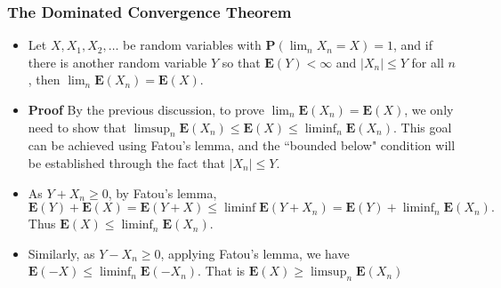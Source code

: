 \documentclass[handout]{beamer}
\newcommand{\BP}{\mathbf{P}}
\newcommand{\BE}{\mathbf{E}}
\begin{document}
\frame
{
  \frametitle{The Dominated Convergence Theorem} 

   \begin{itemize}
   
  
   \item<1->[] \begin{Theorem} Let $X, X_1, X_2, \ldots $ be random variables with $\BP(\lim_n X_n=X)=1$, and if there is another random variable $Y$ so that $\BE(Y)<\infty$ and $|X_n|\leq Y$ for all $n$, then $\lim_n \BE(X_n)=\BE(X)$.\end{Theorem}

                
                               \item<2-> \textbf{Proof} By the previous discussion, to prove $\lim_n \BE(X_n)=\BE(X)$, we only need to show that  $\limsup_n \BE(X_n)\leq \BE(X)\leq  \liminf_n \BE(X_n)$. This goal can be achieved using Fatou's lemma, and the ``bounded below" condition will be established through the fact that  $|X_n|\leq Y$. 
                               
                               
                               
                             \item<3->[-] As $Y+X_n\geq 0$, by Fatou's lemma, $\BE(Y)+\BE(X)=\BE(Y+X) \leq \liminf \BE(Y+X_n)=\BE(Y)+\liminf_n \BE(X_n).$ Thus $\BE(X)\leq \liminf_n \BE(X_n)$.
                             
                                                       \item<4->[-]  Similarly, as $Y-X_n\geq 0$,  applying Fatou's lemma, we have $\BE(-X)\leq \liminf_n \BE(-X_n)$. That is $\BE(X)\geq \limsup_n \BE(X_n)$
                             

                              \end{itemize}
}
\end{document}
